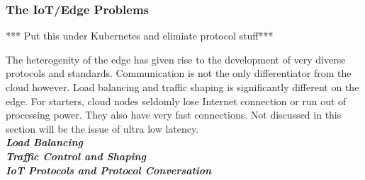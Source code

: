 \subsubsection{The IoT/Edge Problems} \label{edgeIoT}
*** Put this under Kubernetes and elimiate protocol stuff***

The heterogenity of the edge has given rise to the development of very diverse protocols and standards. Communication is not the only differentiator from the cloud however. Load balancing and traffic shaping is significantly different on the edge. For starters, cloud nodes seldomly lose Internet connection or run out of processing power. They also have very fast connections. Not discussed in this section will be the issue of ultra low latency. \\[0.5mm]

\textbf{\textit{Load Balancing}}\\

\textbf{\textit{Traffic Control and Shaping}}\\

\textbf{\textit{IoT Protocols and Protocol Conversation}}\\




